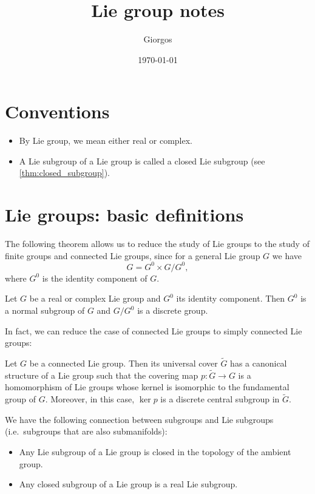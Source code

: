\documentclass{report}
\title{Lie group notes}
\author{Giorgos}
\date{\today}
\begin{document}
\maketitle

\tableofcontents

\chapter*{Conventions}
\begin{itemize}
    \item By Lie group, we mean either real or complex.
    \item A Lie subgroup of a Lie group is called a closed Lie subgroup (see \cref{thm:closed_subgroup}). 
\end{itemize}

\chapter{Lie groups: basic definitions}
The following theorem allows us to reduce the study of Lie groups to the study of finite groups and connected Lie groups, since for a general Lie group $G$ we have
\[
    G = G^0 \times G/G^0,
\]
where $G^0$ is the identity component of $G$.
\begin{theorem}
    Let $G$ be a real or complex Lie group and $G^0$ its identity component.
    Then $G^0$ is a normal subgroup of $G$ and $G/G^0$ is a discrete group.
\end{theorem}

In fact, we can reduce the case of connected Lie groups to simply connected Lie groups:
\begin{theorem}
    Let $G$ be a connected Lie group. Then its universal cover $\tilde G$ has a canonical structure of a Lie group such that the covering map $p: \tilde G \to G$ is a homomorphism of Lie groups whose kernel is isomorphic to the fundamental group of $G$.
    Moreover, in this case, $\ker p$ is a discrete central subgroup in $\tilde G$.
\end{theorem}

We have the following connection between subgroups and Lie subgroups (i.e.\ subgroups that are also submanifolds):
\begin{theorem}\label{thm:closed_subgroup}
    \begin{itemize}
        \item Any Lie subgroup of a Lie group is closed in the topology of the ambient group.
        \item Any closed subgroup of a Lie group is a real Lie subgroup.
    \end{itemize}
\end{theorem}
\printbibliography
\end{document}

